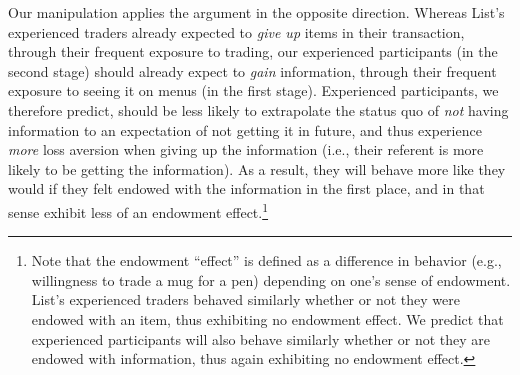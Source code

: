 
Our manipulation applies the argument in the opposite direction. Whereas List’s experienced traders already expected to \emph{give up} items in their transaction, through their frequent exposure to trading, our experienced participants (in the second stage) should already expect to \emph{gain} information, through their frequent exposure to seeing it on menus (in the first stage). Experienced participants, we therefore predict, should be less likely to extrapolate the status quo of \emph{not} having information to an expectation of not getting it in future, and thus experience \emph{more} loss aversion when giving up the information (i.e., their referent is more likely to be getting the information). As a result, they will behave more like they would if they felt endowed with the information in the first place, and in that sense exhibit less of an endowment effect.\footnote{Note that the endowment \enquote{effect} is defined as a difference in behavior (e.g., willingness to trade a mug for a pen) depending on one’s sense of endowment. List’s experienced traders behaved similarly whether or not they were endowed with an item, thus exhibiting no endowment effect. We predict that experienced participants will also behave similarly whether or not they are endowed with information, thus again exhibiting no endowment effect.}

